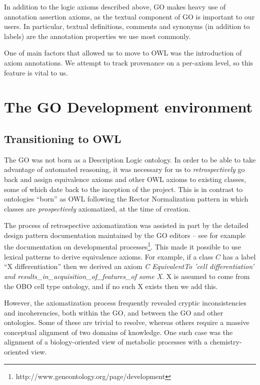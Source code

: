 \documentclass{llncs}
\begin{document}
In addition to the logic axioms described above, GO makes heavy use of
annotation assertion axioms, as the textual component of GO is
important to our users. In particular, textual definitions, comments
and synonyms (in addition to labels) are the annotation properties we
use most commonly.

One of main factors that allowed us to move to OWL was the
introduction of axiom annotations. We attempt to track provenance on a
per-axiom level, so this feature is vital to us.


\section{The GO Development environment}

\subsection{Transitioning to OWL}


The GO was not born as a Description Logic ontology. In order to be
able to take advantage of automated reasoning, it was necessary for us
to \emph{retrospectively} go back and assign equivalence axioms and
other OWL axioms to existing classes, some of which date back to the
inception of the project. This is in contrast to ontologies ``born''
as OWL following the Rector Normalization
pattern\cite{rector_modularisation_2003} in which classes are
\emph{prospectively} axiomatized, at the time of creation.

The process of retrospective axiomatization was assisted in part by
the detailed design pattern documentation maintained by the GO editors
-- see for example the documentation on developmental
processes\footnote{http://www.geneontology.org/page/development}. This
made it possible to use lexical patterns to derive equivalence
axioms\cite{Mungall2010GOXP}. For example, if a class $C$ has a label
``X differentiation'' then we derived an axiom \emph{C EquivalentTo
  'cell differentiation' and
  results\_in\_acquisition\_of\_features\_of some X}. X is assumed to
come from the OBO cell type ontology, and if no such X exists then we
add this.

However, the axiomatization process frequently revealed cryptic
inconsistencies and incoherencies, both within the GO, and between the
GO and other ontologies. Some of these are trivial to resolve, whereas
others require a massive conceptual alignment of two domains of
knowledge. One such case was the alignment of a biology-oriented view
of metabolic processes with a chemistry-oriented view\cite{Hill2013}.
\end{document}
